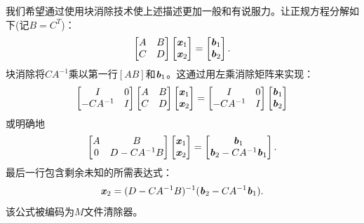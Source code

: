 我们希望通过使用块消除技术使上述描述更加一般和有说服力。让正规方程分解如下(记$B=C^{T}$)：
\begin{align*}
\begin{bmatrix}
A  & B\\
C  & D
\end{bmatrix}
\begin{bmatrix}
\textbf{\textit{x}}_{1}\\
\textbf{\textit{x}}_{2}
\end{bmatrix} =
\begin{bmatrix}
\textbf{\textit{b}}_{1}\\
\textbf{\textit{b}}_{2}
\end{bmatrix}.
\end{align*}
块消除将$CA^{-1}$乘以第一行$[A B]$和$\textbf{\textit{b}}_{1}$。这通过用左乘消除矩阵来实现：
\begin{align*}
\begin{bmatrix}
I  &  0\\
-CA^{-1} & I
\end{bmatrix}
\begin{bmatrix}
A  &  B\\
C &   D
\end{bmatrix}
\begin{bmatrix}
\textbf{\textit{x}}_{1}\\
\textbf{\textit{x}}_{2}
\end{bmatrix} =
\begin{bmatrix}
I  &  0\\
-CA^{-1} & I
\end{bmatrix}
\begin{bmatrix}
\textbf{\textit{b}}_{1}\\
\textbf{\textit{b}}_{2}
\end{bmatrix}
\end{align*}
或明确地
\begin{align*}
\begin{bmatrix}
A & B\\
0 & D-CA^{-1}B
\end{bmatrix}
\begin{bmatrix}
\textbf{\textit{x}}_{1}\\
\textbf{\textit{x}}_{2}
\end{bmatrix}
=
\begin{bmatrix}
\textbf{\textit{b}}_{1}\\
\textbf{\textit{b}}_{2} - CA^{-1}\textbf{\textit{b}}_{1}
\end{bmatrix}.
\end{align*}
最后一行包含剩余未知的所需表达式：
\begin{align}
\textbf{\textit{x}}_{2} = (D-CA^{-1}B)^{-1}(\textbf{\textit{b}}_{2} - CA^{-1}\textbf{\textit{b}}_{1}).
\end{align}
该公式被编码为$M$文件清除器。

